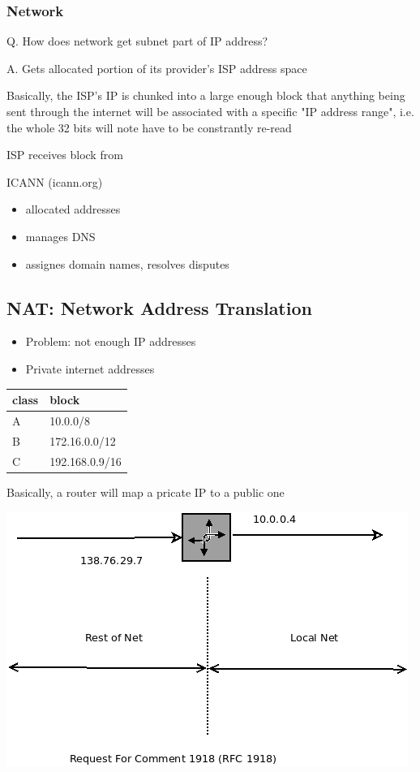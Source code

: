 \documentclass[11pt]{article}
\begin{document}
\subsubsection{Network}
\label{sec:org17df893}
Q. How does network get subnet part of IP address?

A. Gets allocated portion of its provider's ISP address space

Basically, the ISP's IP is chunked into a large enough block that
anything being sent through the internet will be associated with a
specific "IP address range", i.e. the whole 32 bits will note have to
be constrantly re-read

ISP receives block from 

ICANN (icann.org)
\begin{itemize}
\item allocated addresses
\item manages DNS
\item assignes domain names, resolves disputes
\end{itemize}

\subsection{NAT: Network Address Translation}
\label{sec:org1b41b26}

\begin{itemize}
\item Problem: not enough IP addresses
\item Private internet addresses
\end{itemize}

\begin{center}
\begin{tabular}{ll}
\hline
class & block\\
\hline
A & 10.0.0/8\\
B & 172.16.0.0/12\\
C & 192.168.0.9/16\\
\hline
\end{tabular}
\end{center}

Basically, a router will map a pricate IP to a public one

\begin{center}
\includegraphics[width=.9\linewidth]{../img/routerIPMap.png}
\end{center}
\end{document}
